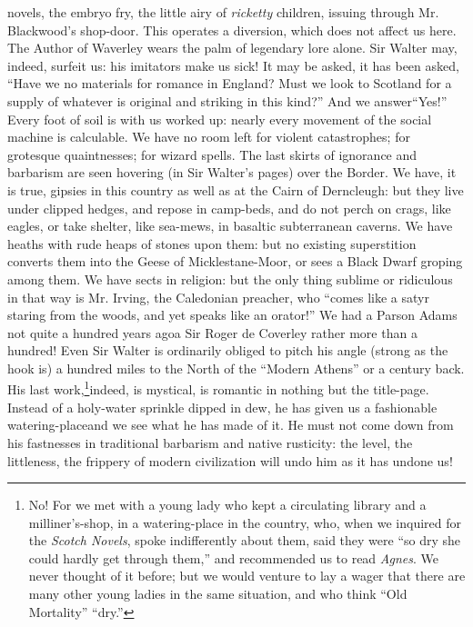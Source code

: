 novels, the embryo fry, the little airy of \emph{ricketty} children,
issuing through Mr. Blackwood's shop-door.  This operates a
diversion, which does not affect us here. The Author of Waverley
wears the palm of legendary lore alone. Sir Walter may, indeed,
surfeit us: his imitators make us sick! It may be asked, it has
been asked, ``Have we no materials for romance in England? Must we
look to Scotland for a supply of whatever is original and striking
in this kind?'' And we answer\textemdash ``Yes!'' Every foot of soil is with us
worked up: nearly every movement of the social machine is
calculable. We have no room left for violent catastrophes; for
grotesque quaintnesses; for wizard spells. The last skirts of
ignorance and barbarism are seen hovering (in Sir Walter's pages)
over the Border. We have, it is true, gipsies in this country as
well as at the Cairn of Derncleugh: but they live under clipped
hedges, and repose in camp-beds, and do not perch on crags, like
eagles, or take shelter, like sea-mews, in basaltic subterranean
caverns. We have heaths with rude heaps of stones upon them: but
no existing superstition converts them into the Geese of
Micklestane-Moor, or sees a Black Dwarf groping among them. We
have sects in religion: but the only thing sublime or ridiculous
in that way is Mr. Irving, the Caledonian preacher, who ``comes
like a satyr staring from the woods, and yet speaks like an
orator!'' We had a Parson Adams not quite a hundred years ago\textemdash a
Sir Roger de Coverley rather more than a hundred! Even Sir Walter
is ordinarily obliged to pitch his angle (strong as the hook is) a
hundred miles to the North of the ``Modern Athens'' or a century
back. His last work,\footnote{No! For we met with a young lady who kept a
circulating library and a milliner's-shop, in a watering-place in
the country, who, when we inquired for the \emph{Scotch Novels}, spoke
indifferently about them, said they were ``so dry she could hardly
get through them,'' and recommended us to read \emph{Agnes}. We never
thought of it before; but we would venture to lay a wager that
there are many other young ladies in the same situation, and who
think ``Old Mortality'' ``dry.''}indeed, is mystical, is romantic in
nothing but the title-page. Instead of a holy-water sprinkle
dipped in dew, he has given us a fashionable watering-place\textemdash and
we see what he has made of it. He must not come down from his
fastnesses in traditional barbarism and native rusticity: the
level, the littleness, the frippery of modern civilization will
undo him as it has undone us!

